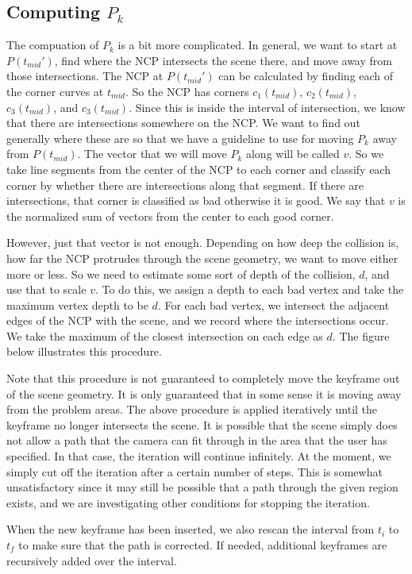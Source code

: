 \subsection{Computing $P_{k}$}
The compuation of $P_{k}$ is a bit more complicated.
In general, we want to start at $P(t_{mid}')$, find where the NCP intersects
the scene there, and move away from those intersections.
The NCP at $P(t_{mid}')$ can be calculated by finding each of the corner curves
at $t_{mid}$.
So the NCP has corners $c_{1}(t_{mid})$, $c_{2}(t_{mid})$, $c_{3}(t_{mid})$, 
and $c_{3}(t_{mid})$.
Since this is inside the interval of intersection, we know that there are
intersections somewhere on the NCP.
We want to find out generally where these are so that we have a guideline to 
use for moving $P_{k}$ away from $P(t_{mid})$.
The vector that we will move $P_{k}$ along will be called $v$.
So we take line segments from the center of the NCP to each corner and
classify each corner by whether there are intersections along that segment.
If there are intersections, that corner is classified as bad otherwise it is
good.
We say that $v$ is the normalized sum of vectors from the center to each good
corner.



However, just that vector is not enough.
Depending on how deep the collision is, how far the NCP protrudes through the
scene geometry, we want to move either more or less.
So we need to estimate some sort of depth of the collision, $d$, and use that
to scale $v$.
To do this, we assign a depth to each bad vertex and take the maximum vertex
depth to be $d$.
For each bad vertex, we intersect the adjacent edges of the NCP with the
scene, and we record where the intersections occur.
We take the maximum of the closest intersection on each edge as $d$.  The
figure below illustrates this procedure.


Note that this procedure is not guaranteed to completely move the keyframe
out of the scene geometry.
It is only guaranteed that in some sense it is moving away from the problem
areas.
The above procedure is applied iteratively until the keyframe no longer
intersects the scene.
It is possible that the scene simply does not allow a path that the camera
can fit through in the area that the user has specified.
In that case, the iteration will continue infinitely.
At the moment, we simply cut off the iteration after a certain number of
steps.
This is somewhat unsatisfactory since it may still be possible that a path
through the given region exists, and we are investigating other conditions
for stopping the iteration.

When the new keyframe has been inserted, we also rescan the interval from
$t_{i}$ to $t_{f}$ to make sure that the path is corrected. If needed,
additional keyframes are recursively added over the interval.
